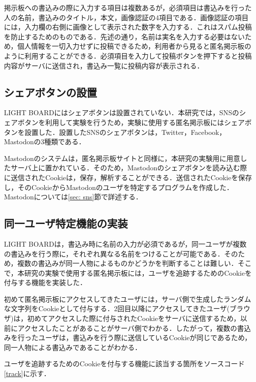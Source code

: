 \documentclass[10pt, a4paper]{jreport}
\begin{document}
掲示板への書込みの際に入力する項目は複数あるが，必須項目は書込みを行った人の名前，書込みのタイトル，本文，画像認証の4項目である．画像認証の項目には，入力欄の右側に画像として表示された数字を入力する．これはスパム投稿を防止するためのものである．先述の通り，名前は実名を入力する必要はないため，個人情報を一切入力せずに投稿できるため，利用者から見ると匿名掲示板のように利用することができる．必須項目を入力して投稿ボタンを押下すると投稿内容がサーバに送信され，書込み一覧に投稿内容が表示される．

\subsection{シェアボタンの設置}
LIGHT BOARDにはシェアボタンは設置されていない．本研究では，SNSのシェアボタンを利用して実験を行うため，実験に使用する匿名掲示板にはシェアボタンを設置した．設置したSNSのシェアボタンは，Twitter，Facebook，Mastodonの3種類である．

Mastodonのシステムは，匿名掲示板サイトと同様に，本研究の実験用に用意したサーバ上に置かれている．そのため，Mastodonのシェアボタンを読み込む際に送信されたCookieは，保存，解析することができる．送信されたCookieを保存し，そのCookieからMastodonのユーザを特定するプログラムを作成した．Mastodonについては\ref{sec: sns}節で詳述する．

\subsection{同一ユーザ特定機能の実装}
LIGHT BOARDは，書込み時に名前の入力が必須であるが，同一ユーザが複数の書込みを行う際に，それぞれ異なる名前をつけることが可能である．そのため，複数の書込みが同一人物によるものかどうかを判断することは難しい．そこで，本研究の実験で使用する匿名掲示板には，ユーザを追跡するためのCookieを付与する機能を実装した．

初めて匿名掲示板にアクセスしてきたユーザには，サーバ側で生成したランダムな文字列をCookieとして付与する．2回目以降にアクセスしてきたユーザ(ブラウザ)は，初めてアクセスした際に付与されたCookieをサーバに送信するため，以前にアクセスしたことがあることがサーバ側でわかる．したがって，複数の書込みを行ったユーザは，書込みを行う際に送信しているCookieが同じであるため，同一人物による書込みであることがわかる．

ユーザを追跡するためのCookieを付与する機能に該当する箇所をソースコード\ref{track}に示す．
\end{document}
